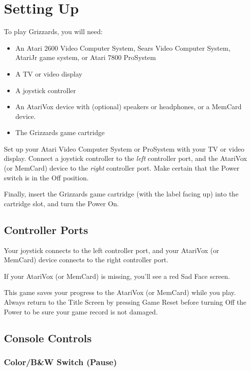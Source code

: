 \documentclass[12pt,twoside,openright,book]{memoir}
\begin{document}
\chapter{Setting Up}\label{Setting Up}

To play Grizzards, you will need:

\begin{itemize}
\item An Atari 2600 Video  Computer System, Sears Video Computer System,
  AtariJr game system, or Atari 7800 ProSystem
\item A TV or video display
\item A joystick controller
\item  An AtariVox  device with  (optional) speakers  or headphones,  or
  a MemCard device.
\item The Grizzards game cartridge
\end{itemize}

Set up  your Atari Video  Computer System or  ProSystem with your  TV or
video  display.  Connect  a   joystick  controller  to  the  \emph{left}
controller  port,   and  the  AtariVox   (or  MemCard)  device   to  the
\emph{right} controller port.  Make certain that the Power  switch is in
the Off position.

Finally, insert the Grizzards game  cartridge (with the label facing up)
into the cartridge slot, and turn the Power On.

\section{Controller Ports}

Your joystick  connects to the  left controller port, and  your AtariVox
(or MemCard) device connects to the right controller port.

If  your  AtariVox  (or  MemCard)  is missing,  you'll  see  a  red  Sad
Face screen.

This game  saves your progress  to the  AtariVox (or MemCard)  while you
play. Always  return to the Title  Screen by pressing Game  Reset before
turning Off the Power to be sure your game record is not damaged.

\section{Console Controls}

\subsection{Color/B\&W Switch (Pause)}
\end{document}
